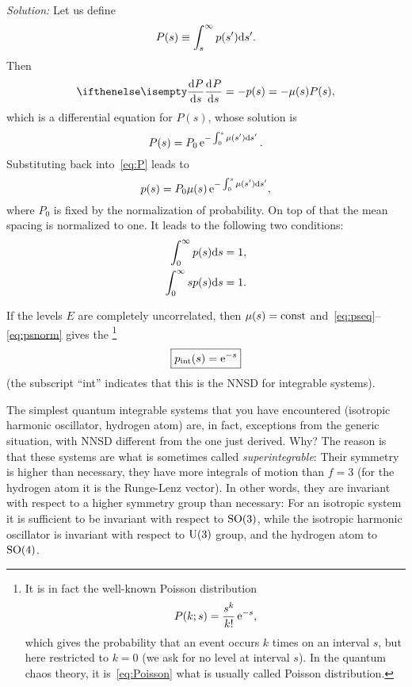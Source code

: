 \documentclass[a4paper,11pt,twoside]{article}
\begin{document}
        \emph{Solution:} Let us define
        \begin{equation}
            P(s)\equiv\int_{s}^{\infty}p(s')\mathrm{d} s'.
        \end{equation}
        Then
        \begin{equation}\label{eq:P}
            \derivative{P}{s}=-p(s)=-\mu(s)P(s),
        \end{equation}
        which is a differential equation for $P(s)$, whose solution is
        \begin{equation}
            P(s)=P_{0}\operatorname{e}^{-\int_{0}^{s}\mu(s')\mathrm{d} s'}.
        \end{equation}
        Substituting back into~\eqref{eq:P} leads to
        \begin{equation}\label{eq:pseq}
            p(s)=P_{0}\mu(s)\operatorname{e}^{-\int_{0}^{s}\mu(s')\mathrm{d} s'},
        \end{equation}
        where $P_{0}$ is fixed by the normalization of probability.
        On top of that the mean spacing is normalized to one.
        It leads to the following two conditions:
        \begin{align}
            \int_{0}^{\infty}p(s)\mathrm{d} s&=1,\nonumber\\
            \label{eq:psnorm}
            \int_{0}^{\infty}s p(s)\mathrm{d} s&=1.
        \end{align}
         
        If the levels $E$ are completely uncorrelated, then $\mu(s)=\mathrm{const}$ and~\eqref{eq:pseq}--\eqref{eq:psnorm} gives the \footnote{It is in fact the well-known Poisson distribution
        \begin{equation}
            P(k;s)=\frac{s^{k}}{k!}\operatorname{e}^{-s},
        \end{equation}
        which gives the probability that an event occurs $k$ times on an interval $s$, but here restricted to $k=0$ (we ask for no level at interval $s$).
        In the quantum chaos theory, it is~\eqref{eq:Poisson} what is usually called Poisson distribution.}   
        \begin{equation}
            \label{eq:Poisson}
            \boxed{p_{\text{int}}(s)=\operatorname{e}^{-s}}
        \end{equation}
        (the subscript ``int'' indicates that this is the NNSD for integrable systems).
        
        The simplest quantum integrable systems that you have encountered (isotropic harmonic oscillator, hydrogen atom) are, in fact, exceptions from the generic situation, with NNSD different from the one just derived. 
        Why? 
        The reason is that these systems are what is sometimes called \emph{superintegrable}: Their symmetry is higher than necessary, they have more integrals of motion than $f=3$ (for the hydrogen atom it is the Runge-Lenz vector).
        In other words, they are invariant with respect to a higher symmetry group than necessary: For an isotropic system it is sufficient to be invariant with respect to $\mathrm{SO(3)}$, while the isotropic harmonic oscillator is invariant with respect to $\mathrm{U(3)}$ group, and the hydrogen atom to $\mathrm{SO(4)}$.
\end{document}
